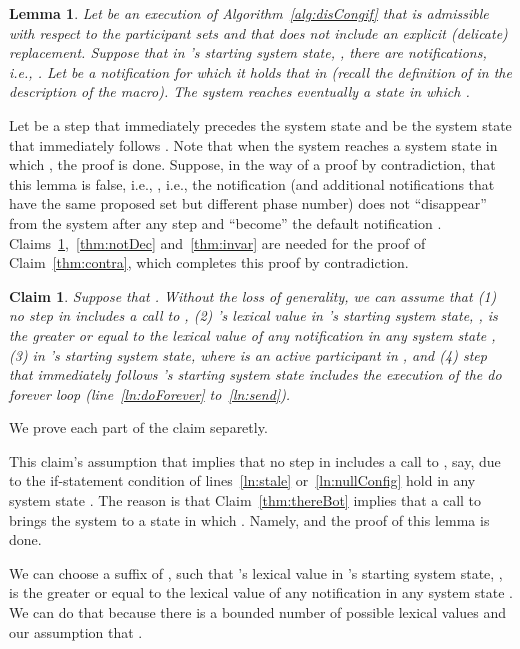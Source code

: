 \documentclass[11pt]{article}
\newtheorem{lemma}[theorem]{Lemma}
\newtheorem{claim}[theorem]{Claim}
\newenvironment{proof}{\noindent{\bf Proof.}}{\hfill}
\begin{document}
\begin{lemma}
\label{thm:convDeg}
Let  be an execution of Algorithm~\ref{alg:disCongif} that is admissible with respect to the participant sets and that does not include an explicit (delicate) replacement. 
Suppose that in 's starting system state, , there are notifications, i.e., . Let  be a notification for which it holds that  in  (recall the definition of  in the description of the  macro).
The system reaches eventually a state  in which .
\end{lemma}
\begin{proof}
Let  be a step that immediately precedes the system state  and  be the system state that immediately follows .
Note that when the system reaches a system state  in which , the proof is done.
Suppose, in the way of a proof by contradiction, that this lemma is false, i.e., , i.e., the notification  (and additional  notifications that have the same proposed set but different phase number) does not ``disappear'' from the system after any step and ``become'' the default notification . 
Claims~\ref{thm:general},~\ref{thm:notDec} and~\ref{thm:invar} are needed for the proof of Claim~\ref{thm:contra}, which completes this proof by contradiction.

\begin{claim}
\label{thm:general}
Suppose that .
Without the loss of generality, we can assume that (1) no step in  includes a call to , (2) 's lexical value in 's starting system state, , is the greater or equal to the lexical value of any notification in any system state , (3)  in 's starting system state, where  is an active participant in , and (4) step  that immediately follows 's starting system state includes the execution of the do forever loop (line~\ref{ln:doForever} to~\ref{ln:send}). 
\end{claim}
\begin{proof}
	We prove each part of the claim separetly. 
	
This claim's assumption that  implies that no step in  includes a call to , say, due to the if-statement condition of lines~\ref{ln:stale} or~\ref{ln:nullConfig} hold in any system state . The reason is that Claim~\ref{thm:thereBot} implies that a call to  brings the system to a state   in which . Namely,  and the proof of this  lemma is done.

We can choose a suffix of , such that 's  lexical value in 's starting system state, , is the greater or equal to the lexical value of any notification in any system state . We can do that because there is a bounded number of possible lexical values and our assumption that . 


\end{proof}
\end{proof}
\end{document}

